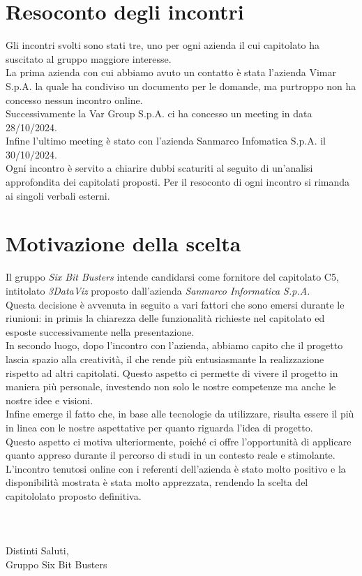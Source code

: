 \section{Resoconto degli incontri}
Gli incontri svolti sono stati tre, uno per ogni azienda il cui capitolato ha suscitato al gruppo maggiore interesse.\\
La prima azienda con cui abbiamo avuto un contatto è stata l'azienda Vimar S.p.A. la quale ha condiviso un documento per le domande, ma purtroppo non ha concesso nessun incontro online.\\
Successivamente la Var Group S.p.A. ci ha concesso un meeting in data 28/10/2024.\\
Infine l'ultimo meeting è stato con l'azienda Sanmarco Infomatica S.p.A. il 30/10/2024.\\
Ogni incontro è servito a chiarire dubbi scaturiti al seguito di un'analisi approfondita dei capitolati proposti.
Per il resoconto di ogni incontro si rimanda ai singoli verbali esterni.
\\

\section{Motivazione della scelta}
Il gruppo \textit{Six Bit Busters} intende candidarsi come fornitore del capitolato C5, intitolato \textit{3DataViz} proposto dall'azienda \textit{Sanmarco Informatica S.p.A.}\\
Questa decisione è avvenuta in seguito a vari fattori che sono emersi durante le riunioni: in primis la chiarezza delle funzionalità richieste nel capitolato ed esposte successivamente nella presentazione. 
\\In secondo luogo, dopo l’incontro con l’azienda, abbiamo capito che il progetto lascia spazio alla creatività, il che rende più entusiasmante la realizzazione rispetto ad altri capitolati. Questo aspetto ci permette di vivere il progetto in maniera più personale, investendo non solo le nostre competenze ma anche le nostre idee e visioni. %
\\Infine emerge il fatto che, in base alle tecnologie da utilizzare, risulta essere il più in linea con le nostre aspettative per quanto riguarda l’idea di progetto. \\Questo aspetto ci motiva ulteriormente, poiché ci offre l'opportunità di applicare quanto appreso durante il percorso di studi in un contesto reale e stimolante.
\\L'incontro tenutosi online con i referenti dell'azienda è stato molto positivo e la disponibilità mostrata è stata molto apprezzata, rendendo la scelta del capitololato proposto definitiva.\\\\\\\\

Distinti Saluti,\\

Gruppo Six Bit Busters